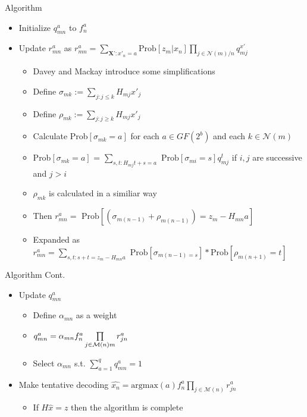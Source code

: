 \documentclass[10pt,ignorenonframetext,]{beamer}
\providecommand{\tightlist}{%
  \setlength{\itemsep}{0pt}\setlength{\parskip}{0pt}}
\begin{document}
\begin{frame}{Algorithm}
\protect\hypertarget{algorithm}{}
\begin{itemize}[<+->]
\tightlist
\item
  Initialize \(q_{mn}^a\) to \(f^a_n\)
\item
  Update \(r_{mn}^a\) as
  \(r_{mn}^a = \sum\limits_{\textbf{X'}:x'_n=a}\text{Prob}[z_m|x_n]\prod\limits_{j\in\mathcal{N}(m)/n}q^{x'}_{mj}\)

  \begin{itemize}[<+->]
  \tightlist
  \item
    Davey and Mackay introduce some simplifications
  \item
    Define \(\sigma_{mk} := \sum_{j:j\le k} H_{mj}x'_j\)
  \item
    Define \(\rho_{mk} := \sum_{j:j\ge k} H_{mj}x'_j\)
  \item
    Calculate Prob\([\sigma_{mk}=a]\) for each \(a\in GF(2^b)\) and each
    \(k\in \mathcal{N}(m)\)
  \item
    Prob\([\sigma_{mk}=a]\) =
    \(\sum\limits_{s,t:H_{mj}t+s=a}\text{ Prob}[\sigma_{mi}=s]q^t_{mj}\)
    if \(i,j\) are successive and \(j>i\)
  \item
    \(\rho_{mk}\) is calculated in a similiar way
  \item
    Then
    \(r^a_{mn} = \text{ Prob}[(\sigma_{m(n-1)}+\rho_{m(n-1)})=z_m-H_{mn}a]\)
  \item
    Expanded as
    \(r^a_{mn} = \sum\limits_{s,t:s+t=z_m-H_{mn}a}\text{ Prob}[\sigma_{m(n-1)=s}] * \text{Prob}[\rho_{m(n+1)}=t]\)
  \end{itemize}
\end{itemize}
\end{frame}

\begin{frame}{Algorithm Cont.}
\protect\hypertarget{algorithm-cont.}{}
\begin{itemize}[<+->]
\tightlist
\item
  Update \(q^a_{mn}\)

  \begin{itemize}[<+->]
  \tightlist
  \item
    Define \(\alpha_{mn}\) as a weight
  \item
    \(q^a_{mn} = \alpha_{mn} f^a_n\prod\limits_{j\in\mathcal{M}(n)\\m}r^a_{jn}\)
  \item
    Select \(\alpha_{mn}\) s.t. \(\sum_{a=1}^q q^a_{mn} = 1\)
  \end{itemize}
\item
  Make tentative decoding
  \(\hat{x_n} = \text{argmax}(a)f^a_n\prod\limits_{j\in\mathcal{M}(n)}r^a_{jn}\)

  \begin{itemize}[<+->]
  \tightlist
  \item
    If \(H\hat{x} = z\) then the algorithm is complete
  \end{itemize}
\end{itemize}
\end{frame}
\end{document}
